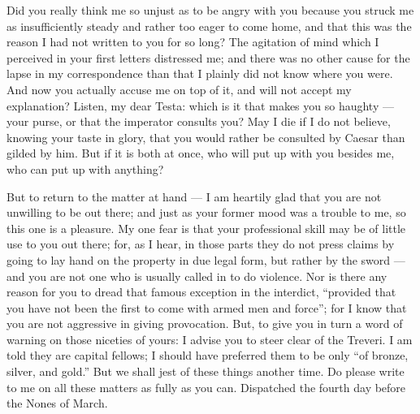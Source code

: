 

 Did you really think me so unjust as to be angry with you because you struck me as insufficiently steady and rather too eager to come home, and that this was the reason I had not written to you for so long? The agitation of mind which I perceived in your first letters distressed me; and there was no other cause for the lapse in my correspondence than that I plainly did not know where you were. And now you actually accuse me on top of it, and will not accept my explanation? Listen, my dear Testa: which is it that makes you so haughty --- your purse, or that the imperator consults you? May I die if I do not believe, knowing your taste in glory, that you would rather be consulted by Caesar than gilded by him. But if it is both at once, who will put up with you besides me, who can put up with anything?

 But to return to the matter at hand --- I am heartily glad that you are not unwilling to be out there; and just as your former mood was a trouble to me, so this one is a pleasure. My one fear is that your professional skill may be of little use to you out there; for, as I hear, in those parts they do not press claims by going to lay hand on the property in due legal form, but rather by the sword --- and you are not one who is usually called in to do violence. Nor is there any reason for you to dread that famous exception in the interdict, ``provided that you have not been the first to come with armed men and force''; for I know that you are not aggressive in giving provocation. But, to give you in turn a word of warning on those niceties of yours: I advise you to steer clear of the Treveri. I am told they are capital fellows; I should have preferred them to be only ``of bronze, silver, and gold.'' But we shall jest of these things another time. Do please write to me on all these matters as fully as you can. Dispatched the fourth day before the Nones of March.
